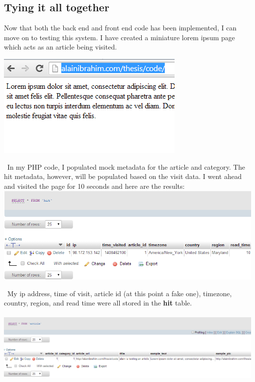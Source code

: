 \documentclass[12pt]{article}
\begin{document}
\subsection{Tying it all together}
Now that both the back end and front end code has been implemented, I can move on to testing this system. I have created a miniature lorem ipsum page which acts as an article being visited. 

\noindent\includegraphics[scale=1]{img/visit1}

\noindent\ In my PHP code, I populated mock metadata for the article and category. The hit metadata, however, will be populated based on the visit data. I went ahead and visited the page for 10 seconds and here are the results:\\

\noindent\includegraphics[scale=0.6]{img/visit2}

\noindent\ My ip address, time of visit, article id (at this point a fake one), timezone, country, region, and read time were all stored in the \textbf{hit} table.\\ \\

\noindent\includegraphics[scale=0.5]{img/visit3}
\end{document}
